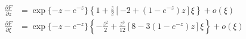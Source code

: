 {\color{red}
\begin{align*}
  \frac{\partial F}{\partial z}
  &= \exp\{ -z - e^{-z} \} \left\{ 1 + \frac{z}{2} \left[ -2 + (1 -e^{-z}) z \right] \xi \right\} + o(\xi) \\
  \frac{\partial F}{\partial \xi}
  &= \exp\{ -z - e^{-z} \}
    \left\{-\frac{z^2}{2}
    + \frac{z^3}{12} \left[8 - 3 (1 -e^{-z}) z \right] \xi \right\}
    + o(\xi)
\end{align*}
}




